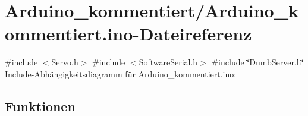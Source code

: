 \hypertarget{_arduino__kommentiert_8ino}{}\section{Arduino\+\_\+kommentiert/\+Arduino\+\_\+kommentiert.ino-\/\+Dateireferenz}
\label{_arduino__kommentiert_8ino}
{\ttfamily \#include $<$Servo.\+h$>$}\newline
{\ttfamily \#include $<$Software\+Serial.\+h$>$}\newline
{\ttfamily \#include \char`\"{}Dumb\+Server.\+h\char`\"{}}\newline
Include-\/\+Abhängigkeitsdiagramm für Arduino\+\_\+kommentiert.\+ino\+:
\subsection*{Funktionen}

